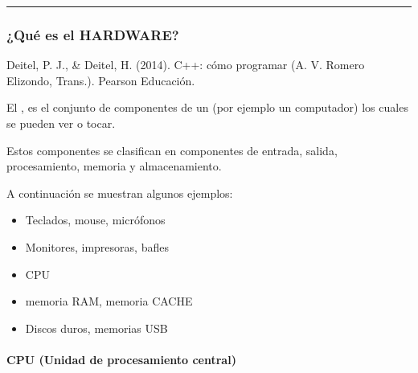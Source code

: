 \documentclass[letterpaper,10pt,spanish]{sphinxmanual}
\begin{document}
\bigskip\hrule\bigskip



\subsubsection{¿Qué es el HARDWARE?}
\label{\detokenize{1_guias/8logica/G821:que-es-el-hardware}}
\sphinxAtStartPar
%
\begin{footnote}[1]\sphinxAtStartFootnote
Deitel, P. J., \& Deitel, H. (2014). C++: cómo programar (A. V. Romero Elizondo, Trans.). Pearson Educación.
%
\end{footnote} El , es el conjunto de componentes de un  (por ejemplo un computador) los cuales se pueden ver o tocar.

\sphinxAtStartPar
Estos componentes se clasifican en componentes de entrada, salida, procesamiento, memoria y almacenamiento.

\sphinxAtStartPar
A continuación se muestran algunos ejemplos:
\begin{itemize}
\item {} 
\sphinxAtStartPar
{} Teclados, mouse, micrófonos

\item {} 
\sphinxAtStartPar
{} Monitores, impresoras, bafles

\item {} 
\sphinxAtStartPar
{} CPU

\item {} 
\sphinxAtStartPar
{} memoria RAM, memoria CACHE

\item {} 
\sphinxAtStartPar
{} Discos duros, memorias USB

\end{itemize}


\paragraph{CPU (Unidad de procesamiento central)}
\label{\detokenize{1_guias/8logica/G821:cpu-unidad-de-procesamiento-central}}
\end{document}
